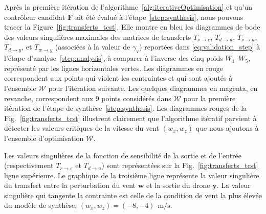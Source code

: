 Après la première itération de l'algorithme~\ref{alg:iterativeOptimisation} et qu'un contrôleur candidat $\boldsymbol{F}$ ait été évalué à l'étape~\ref{step:synthesis}, nous pouvons tracer la Figure~\ref{fig:transferts_tcst}. Elle montre en bleu les diagrammes de bode des valeurs singulières maximales des matrices de transferts $T_{\nu \rightarrow e}$, $T_{d \rightarrow u}$, $T_{\nu \rightarrow u}$, $T_{d \rightarrow y}$, et $T_{w \rightarrow y}$ (associées à la valeur de $\gamma_{\text{v}}$) reportées dans \eqref{eq:validation_step} à l'étape d'analyse~\ref{step:analysis}, à comparer à l'inverse des cinq poids $W_1$--$W_5$, représenté par les lignes horizontales vertes. 
Les diagrammes en rouge correspondent aux points qui violent les contraintes et qui sont ajoutés à l'ensemble ${\mathcal W}$ pour l'itération suivante. Les quelques diagrammes en magenta, en revanche, correspondent aux 9 points considérés dans ${\mathcal W}$ pour la première itération de l'étape de synthèse~\ref{step:synthesis}.
Les diagrammes rouges de la Fig.~\ref{fig:transferts_tcst} illustrent clairement que l'algorithme itératif parvient à détecter les valeurs critiques de la vitesse du vent $(w_x,w_z)$ que nous ajoutons à l'ensemble d'optimisation ${\mathcal W}$.

Les valeurs singulières de la fonction de sensibilité de la sortie et de l'entrée (respectivement $T_{r \rightarrow e}$ et $T_{d \rightarrow u}$) sont représentées sur la Fig.~\ref{fig:transferts_tcst} ligne supérieure. Le graphique de la troisième ligne représente la valeur singulière du transfert entre la perturbation du vent $\boldsymbol{w}$ et la sortie du drone $\boldsymbol{y}$. La valeur singulière qui tangente la contrainte est celle de la condition de vent la plus élevée du modèle de synthèse, $(w_x, w_z) = (-8,-4)~\SI{}{\meter\per\second}$.

